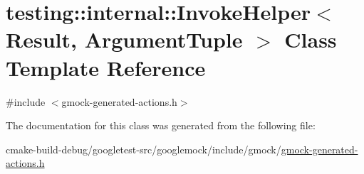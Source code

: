 \hypertarget{classtesting_1_1internal_1_1InvokeHelper}{}\section{testing\+::internal\+::Invoke\+Helper$<$ Result, Argument\+Tuple $>$ Class Template Reference}
\label{classtesting_1_1internal_1_1InvokeHelper}


{\ttfamily \#include $<$gmock-\/generated-\/actions.\+h$>$}



The documentation for this class was generated from the following file\+:\begin{DoxyCompactItemize}
\item 
cmake-\/build-\/debug/googletest-\/src/googlemock/include/gmock/\mbox{\hyperlink{gmock-generated-actions_8h}{gmock-\/generated-\/actions.\+h}}\end{DoxyCompactItemize}
